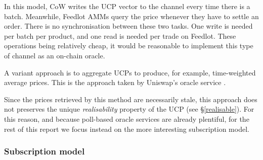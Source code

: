 \documentclass[a4paper,10pt]{article}
\theoremstyle{remark}
\begin{document}
In this model, CoW writes the UCP vector to the channel every time there is a batch. Meanwhile, Feedlot AMMs query the price whenever they have to settle an order.
%
There is no synchronisation between these two tasks.
%
One write is needed per batch per product, and one read is needed per trade on Feedlot.
%
These operations being relatively cheap, it would be reasonable to implement this type of channel as an on-chain oracle.
%

%
A variant approach is to aggregate UCPs to produce, for example, time-weighted average prices. This is the approach taken by Uniswap's oracle service \cite{adams2020uniswap}.

Since the prices retrieved by this method are necessarily stale, this approach does not preserves the unique \emph{realisability} property of the UCP (see \S\ref{realisable}). For this reason, and because poll-based oracle services are already plentiful, for the rest of this report we focus instead on the more interesting subscription model.

\subsubsection{Subscription model}
\end{document}
